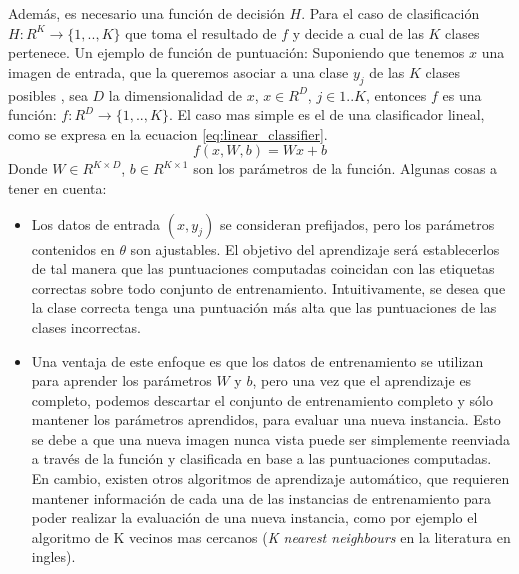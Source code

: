 \documentclass[a4paper,11pt,spanish]{book}
\begin{document}
	  Además, es necesario una función de decisión $H$. Para el caso de clasificación $H:R^K{\rightarrow}\{1,..,K\}$ que toma el resultado de $f$ y decide a cual de las $K$ clases pertenece.
	  Un ejemplo de función de puntuación:
	  Suponiendo que tenemos $x$ una imagen de entrada, que la queremos asociar a una clase $y_{j}$ de las $K$ clases posibles , sea $D$ la dimensionalidad de $x$, $x \in R^D$,
	  $j \in 1..K$, entonces $f$ es una función: $f:R^D {\rightarrow} \{1,..,K\}$. El caso mas simple es el de una clasificador lineal, como se expresa en la ecuacion \eqref{eq:linear_classifier}.
	  \begin{equation}\label{eq:linear_classifier}
	    f(x, W, b) = W x + b
	  \end{equation}
	  Donde $W \in R^{K \times D}$, $b \in R^{K \times 1}$ son los parámetros de la función. 
	  Algunas cosas a tener en cuenta:
	  \begin{itemize}
	   \item Los datos de entrada $(x, y_{j})$  se consideran prefijados, pero los parámetros contenidos en $\theta$ son ajustables.
		 El objetivo del aprendizaje será establecerlos de tal manera que las puntuaciones computadas coincidan con las etiquetas correctas sobre todo conjunto de entrenamiento.
		 Intuitivamente, se desea que la clase correcta tenga una puntuación más alta que las puntuaciones de las clases incorrectas.
	   \item Una ventaja de este enfoque es que los datos de entrenamiento se utilizan para aprender los parámetros $W$ y $b$, pero una vez que el aprendizaje es completo,
		podemos descartar el conjunto de entrenamiento completo y sólo mantener los parámetros aprendidos, para evaluar una nueva instancia. Esto se debe a que una nueva imagen nunca vista puede ser
		simplemente reenviada a través de la función y clasificada en base a las puntuaciones computadas. En cambio, existen otros algoritmos de aprendizaje automático, que requieren
		mantener información de cada una de las instancias de entrenamiento para poder realizar la evaluación de una nueva instancia,
		como por ejemplo el algoritmo de K vecinos mas cercanos (\emph{K nearest neighbours} en la literatura en ingles).
	  \end{itemize}
\fi
\end{document}
